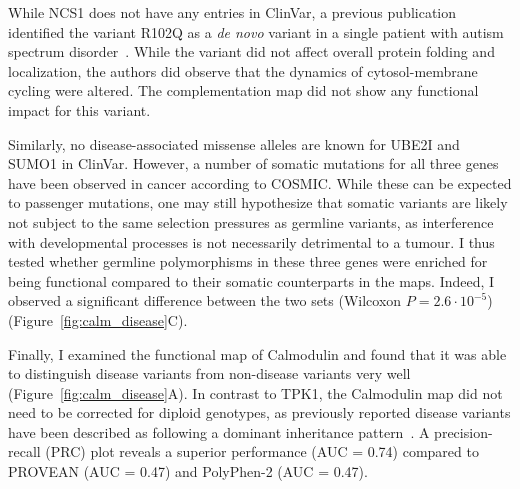 While NCS1 does not have any entries in ClinVar, a previous publication identified the variant R102Q as a \textit{de novo} variant in a single patient with autism spectrum disorder~\cite{handley_structural_2010}. While the variant did not affect overall protein folding and localization, the authors did observe that the dynamics of cytosol-membrane cycling were altered. The complementation map did not show any functional impact for this variant.

Similarly, no disease-associated missense alleles are known for UBE2I and SUMO1 in ClinVar. However, a number of somatic mutations for all three genes have been observed in cancer according to COSMIC. While these can be expected to passenger mutations, one may still hypothesize that somatic variants are likely not subject to the same selection pressures as germline variants, as interference with developmental processes is not necessarily detrimental to a tumour. I thus tested whether germline polymorphisms in these three genes were enriched for being functional compared to their somatic counterparts in the maps. Indeed, I observed a significant difference between the two sets (Wilcoxon $P = 2.6 \cdot 10^{-5}$) (Figure~\ref{fig:calm_disease}C).

Finally, I examined the functional map of Calmodulin and found that it was able to distinguish disease variants from non-disease variants very well (Figure~\ref{fig:calm_disease}A). In contrast to TPK1, the Calmodulin map did not need to be corrected for diploid genotypes, as previously reported disease variants have been described as following a dominant inheritance pattern~\cite{crotti_calmodulin_2013}. A precision-recall (PRC) plot reveals a superior performance (AUC = 0.74) compared to PROVEAN (AUC = 0.47) and PolyPhen-2 (AUC = 0.47).  

